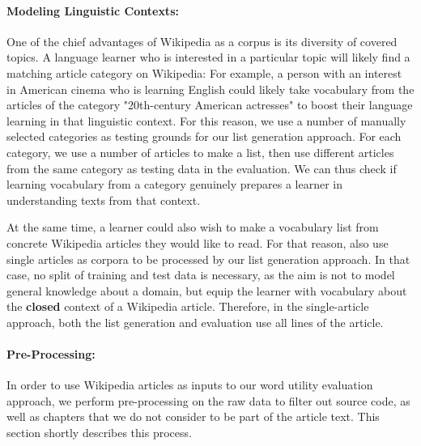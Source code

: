 \paragraph{Modeling Linguistic Contexts:}

One of the chief advantages of Wikipedia as a corpus is its diversity of covered topics.
A language learner who is interested in a particular topic will likely find a matching article category on Wikipedia:
For example, a person with an interest in American cinema who is learning English could likely take vocabulary from the articles of the category "20th-century American actresses" to boost their language learning in that linguistic context.
For this reason, we use a number of manually selected categories as testing grounds for our list generation approach.
For each category, we use a number of articles to make a list, then use different articles from the same category as testing data in the evaluation.
We can thus check if learning vocabulary from a category genuinely prepares a learner in understanding texts from that context.

At the same time, a learner could also wish to make a vocabulary list from concrete Wikipedia articles they would like to read.
For that reason, also use single articles as corpora to be processed by our list generation approach.
In that case, no split of training and test data is necessary, as the aim is not to model general knowledge about a domain, but equip the learner with vocabulary about the \textbf{closed} context of a Wikipedia article.
Therefore, in the single-article approach, both the list generation and evaluation use all lines of the article.




\paragraph{Pre-Processing:} \label{sec:wikipedia-preprocessing}
In order to use Wikipedia articles as inputs to our word utility evaluation approach, we perform pre-processing on the raw data to filter out source code, as well as chapters that we do not consider to be part of the article text.
This section shortly describes this process.

